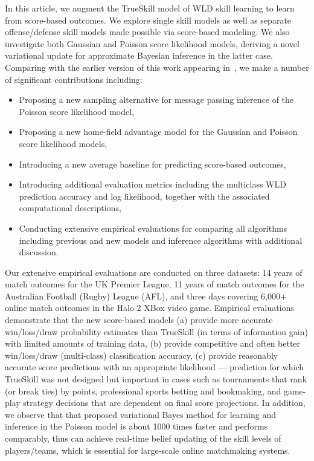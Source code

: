In this article, we augment the TrueSkill model of WLD skill learning to
learn from score-based outcomes. We explore single skill models as
well as separate offense/defense skill models made possible via
score-based modeling. We also investigate both Gaussian and Poisson
score likelihood models, deriving a novel variational update for
approximate Bayesian inference in the latter case. Comparing with the earlier version of this work appearing in~\cite{Guo:ECML2012}, we make a number of significant contributions including: 
\begin{itemize}
	\item Proposing a new sampling alternative for message passing inference of the Poisson score likelihood model, 
	\item Proposing a new home-field advantage model for the Gaussian and Poisson score likelihood models,
	\item Introducing a new average baseline for predicting score-based outcomes,
	\item Introducing additional evaluation metrics including the multiclass WLD prediction accuracy and log likelihood, together with the associated computational descriptions, 
	\item Conducting extensive empirical evaluations for comparing all algorithms including previous and new models and inference algorithms with additional discussion. 
\end{itemize}

Our extensive empirical evaluations are conducted on three datasets: 14 years of match
outcomes for the UK Premier League, 11 years of match outcomes for the
Australian Football (Rugby) League (AFL), and three days covering
6,000+ online match outcomes in the Halo 2 XBox video game.  Empirical
evaluations demonstrate that the new score-based models (a) provide
more accurate win/loss/draw probability estimates than TrueSkill (in terms
of information gain) with limited amounts of training data, (b)
provide competitive and often better win/loss/draw (multi-class) classification
accuracy, (c) provide reasonably accurate score predictions with an appropriate
likelihood --- prediction for which TrueSkill was not designed but
important in cases such as tournaments that rank (or break ties) by
points, professional sports betting and bookmaking, and game-play
strategy decisions that are dependent on final score projections. In addition, we observe that that proposed variational Bayes method for learning and inference in the Poisson model is about 1000 times faster and performs comparably, thus can achieve real-time belief updating of the skill levels of players/teams, which is essential for large-scale online matchmaking systems. 